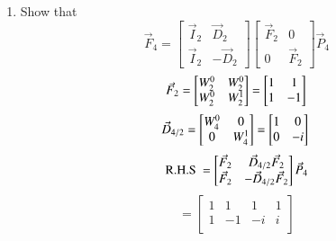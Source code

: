 \documentclass[journal,12pt,twocolumn]{IEEEtran}
\renewcommand\thesection{\arabic{section}}
\begin{document}
\begin{enumerate}[label=\thesection.\arabic*
	,ref=\thesection.\theenumi]
\begin{enumerate}[label=\arabic*.,ref=\thesection.\theenumi]
\begin{equation}
	\boxed{W_{N}^{2} = W_{N/2}}
\end{equation}
\item Show that 
\begin{equation}
	\vec{F}_{4}=
	\begin{bmatrix}
		\vec{I}_{2} & \vec{D}_{2} \\
		\vec{I}_{2} & -\vec{D}_{2}
	\end{bmatrix}
	\begin{bmatrix}
		\vec{F}_{2} & 0 \\
		0 & \vec{F}_{2}
	\end{bmatrix}
	\vec{P}_{4}
\end{equation}
\solution
\begin{equation}
	\vec{F}_{2} = 
	\begin{bmatrix}
		W_{2}^0	&	W_{2}^0\\
		W_{2}^0	&	W_{2}^1
	\end{bmatrix}
	=		\begin{bmatrix}
		1	&	1\\
		1	&	-1
	\end{bmatrix}\\
\end{equation}
\begin{equation}
	\vec{D}_{4/2} =
	\begin{bmatrix}
		W_4^0 &	0\\
		0	&	W_4^1 
	\end{bmatrix}
	=\begin{bmatrix}
		1	&	0\\
		0	&	-i 
	\end{bmatrix}\\
\end{equation}
\begin{equation}
	\text{R.H.S } = 
	\begin{bmatrix}
		\vec{F}_{2} & \vec{D}_{4/2} \vec{F}_{2}\\
		\vec{F}_{2} & -\vec{D}_{4/2} \vec{F}_{2}\\
	\end{bmatrix}\vec{P}_{4}\\
\end{equation}
\begin{equation}
	=\begin{bmatrix}
		1	&	1	&	1	&	1\\
		1	&	-1	&	-i	&	i\\

\end{bmatrix}
\end{equation}
\end{enumerate}
\end{enumerate}
\end{document}
